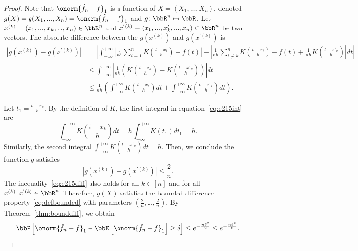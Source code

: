 \documentclass[11pt]{article}
\newcommand{\of}[1]{\left(#1\right)}
\newcommand{\off}[1]{\left[#1\right]}
\newcommand{\aabs}[1]{\left|#1\right|}
\theoremstyle{plain}
\theoremstyle{definition}
\begin{document}
	\begin{proof}
		Note that $\onorm{\hat f_n - f}_1$ is a function of $X = (X_1,...,X_n)$, denoted $g(X) = g(X_1,...,X_n) = \onorm{\hat f_n - f}_1$ and $g\colon \bbR^n \mapsto \bbR$. Let $x^{(k)} = (x_1,...,x_k,...,x_n) \in \bbR^n$ and $x^{'(k)} = (x_1,...,x'_k,...,x_n)\in \bbR^n$ be two vectors. The absolute difference between the $g(x^{(k)})$ and $g(x^{'(k)})$ is
		\begin{align}
			|g(x^{(k)}) - g(x^{'(k)})|
			&= \aabs{\int_{-\infty}^{+\infty} \aabs{ \frac{1}{nh} \sum_{i = 1}^n K \of{\frac{t-x_i}{h}} -f(t)  } -\aabs{ \frac{1}{nh} \sum_{i \neq k}^n K \of{\frac{t-x_i}{h}} -f(t) + \frac{1}{nh} K\of{\frac{t-x'_k}{h}}   } dt} \\
			&\leq \int_{-\infty}^{+\infty} \aabs{\frac{1}{nh} \of{K\of{\frac{t-x_k}{h}} - K\of{\frac{t-x'_k}{h}}  } }dt\\
			&\leq \frac{1}{nh} \of{ \int_{-\infty}^{+\infty} K\of{\frac{t-x_k}{h}}dt + \int_{-\infty}^{+\infty} K\of{\frac{t-x'_k}{h}}dt }.  \label{eq:e215int}
		\end{align}
		
		Let $t_1 = \frac{t-x_k}{h}$. By the definition of $K$, the first integral in equation~\eqref{eq:e215int} are
		\begin{equation}
			\int_{-\infty}^{+\infty} K\of{\frac{t-x_k}{h}}dt = h\int_{-\infty}^{+\infty} K\of{t_1}dt_1 = h.
		\end{equation}
		Similarly, the second integral $\int_{-\infty}^{+\infty} K\of{\frac{t-x'_k}{h}}dt = h$. Then, we conclude the function $g$ satisfies
		\begin{equation}\label{eq:e215diff}
			|g(x^{(k)}) - g(x^{'(k)})|  \leq \frac{2}{n}.
		\end{equation}
		The inequality~\eqref{eq:e215diff} also holds for all $k \in [n]$ and for all $x^{(k)},x^{'(k)} \in \bbR^n$. Therefore, $g(X)$ satisfies the bounded difference property~\eqref{eq:defbounded} with parameters $(\frac{2}{n},..., \frac{2}{n})$. By Theorem~\ref{thm:bounddiff}, we obtain
		\begin{equation}
			\bbP\off{\onorm{\hat f_n - f}_1 - \bbE \off{\onorm{\hat f_n - f}_1} \geq \delta} \leq e^{-\frac{n\delta^2}{2}} \leq e^{-\frac{n\delta^2}{8}} .
		\end{equation}
		
	\end{proof}
	
	
\end{document}
